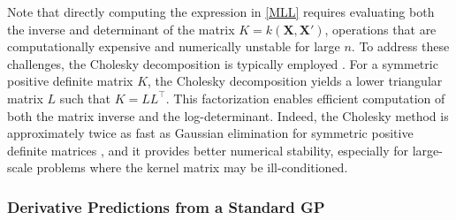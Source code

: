 \documentclass[12pt]{article}
\begin{document}
Note that directly computing the expression in \eqref{MLL} requires evaluating both the inverse and determinant of the matrix $K = k(\mathbf{X}, \mathbf{X}')$, operations that are computationally expensive and numerically unstable for large $n$. To address these challenges, the Cholesky decomposition is typically employed \cite{rasmussen2006gaussian}. For a symmetric positive definite matrix $K$, the Cholesky decomposition yields a lower triangular matrix $L$ such that $K = LL^\top$. This factorization enables efficient computation of both the matrix inverse and the log-determinant. Indeed, the Cholesky method is approximately twice as fast as Gaussian elimination for symmetric positive definite matrices \cite{Allaire2008-by}, and it provides better numerical stability, especially for large-scale problems where the kernel matrix may be ill-conditioned.

\subsubsection{Derivative Predictions from a Standard GP}
\label{subsec:gp_deriv_pred}
\end{document}
